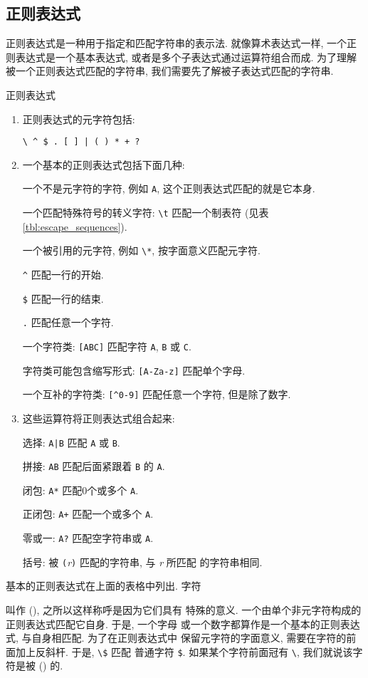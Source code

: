 \subsection{正则表达式}
\label{subsec:regular_expressions}
正则表达式是一种用于指定和匹配字符串的表示法. 就像算术表达式一样,
一个正则表达式是一个基本表达式, 或者是多个子表达式通过运算符组合而成.
为了理解被一个正则表达式匹配的字符串, 我们需要先了解被子表达式匹配的字符串.
\begin{summary}{正则表达式}
\begin{enumerate}
\item 正则表达式的元字符包括: \par
    \verb'\ ^ $ . [ ] | ( ) * + ?'
\item 一个基本的正则表达式包括下面几种: \par
    一个不是元字符的字符, 例如 \verb'A', 这个正则表达式匹配的就是它本身. \par
    一个匹配特殊符号的转义字符: \verb'\t' 匹配一个制表符 (见表
    \ref{tbl:escape_sequences}). \par
    一个被引用的元字符, 例如 \verb'\*', 按字面意义匹配元字符. \par
    \verb'^' 匹配一行的开始. \par
    \verb'$' 匹配一行的结束. \par
    \verb'.' 匹配任意一个字符. \par
    一个字符类: \verb'[ABC]' 匹配字符 \verb'A', \verb'B' 或 \verb'C'. \par
    字符类可能包含缩写形式: \verb'[A-Za-z]' 匹配单个字母. \par
    一个互补的字符类: \verb'[^0-9]' 匹配任意一个字符, 但是除了数字.
\item 这些运算符将正则表达式组合起来:   \par
    选择: \verb'A|B' 匹配 \verb'A' 或 \verb'B'. \par
    拼接: \verb'AB' 匹配后面紧跟着 \verb'B' 的 \verb'A'. \par
    闭包: \verb'A*' 匹配0个或多个 \verb'A'. \par
    正闭包: \verb'A+' 匹配一个或多个 \verb'A'. \par
    零或一: \verb'A?' 匹配空字符串或 \verb'A'. \par
    括号: 被 \verb'('\textit{r}\verb')' 匹配的字符串, 与 \textit{r} 所匹配 
    的字符串相同.
\end{enumerate}
\end{summary}

基本的正则表达式在上面的表格中列出. 字符
叫作  (), 之所以这样称呼是因为它们具有
特殊的意义. 一个由单个非元字符构成的正则表达式匹配它自身. 于是, 一个字母
或一个数字都算作是一个基本的正则表达式, 与自身相匹配.  为了在正则表达式中
保留元字符的字面意义, 需要在字符的前面加上反斜杆. 于是, \verb'\$' 匹配
普通字符 \verb'$'. 如果某个字符前面冠有 \verb'\', 我们就说该字符是被
 () 的.

